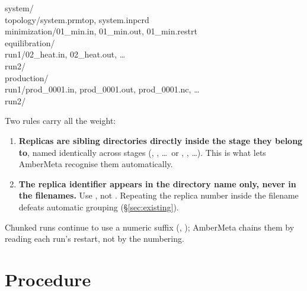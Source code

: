 \documentclass[11pt]{article}
\begin{document}
\begin{shell}
system/\\
\hspace*{1em}topology/\hspace*{2.5em}system.prmtop, system.inpcrd\\
\hspace*{1em}minimization/\hspace*{0.6em}01\_min.in, 01\_min.out, 01\_min.restrt\\
\hspace*{1em}equilibration/\\
\hspace*{2em}run1/\hspace*{3.3em}02\_heat.in, 02\_heat.out, \ldots\\
\hspace*{2em}run2/\\
\hspace*{1em}production/\\
\hspace*{2em}run1/\hspace*{3.3em}prod\_0001.in, prod\_0001.out, prod\_0001.nc, \ldots\\
\hspace*{2em}run2/
\end{shell}

Two rules carry all the weight:

\begin{enumerate}
  \item \textbf{Replicas are sibling directories directly inside the stage they belong
        to}, named identically across stages (, , \ldots\ or
        , , \ldots). This is what lets AmberMeta recognise them
        automatically.
  \item \textbf{The replica identifier appears in the directory name only, never in the
        filenames.} Use , not
        . Repeating the replica number inside the
        filename defeats automatic grouping (\S\ref{sec:existing}).
\end{enumerate}

Chunked runs continue to use a numeric suffix (, );
AmberMeta chains them by reading each run's restart, not by the numbering.

\section{Procedure}
\end{document}

